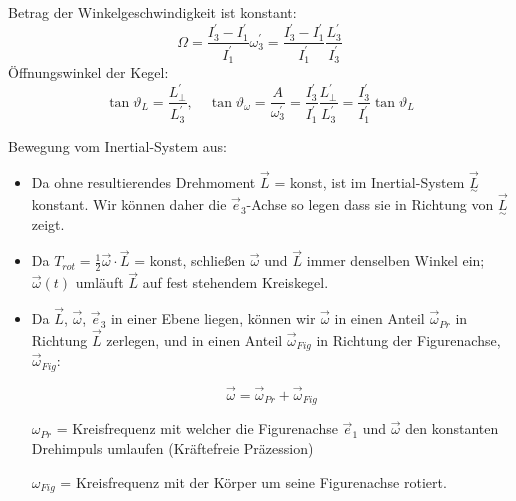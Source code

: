 \documentclass[10pt, letterpaper]{article}
\begin{document}
Betrag der Winkelgeschwindigkeit ist konstant: 
$$\Omega = \frac{I_3^\prime-I_1^\prime}{I_1^\prime}\omega_3^\prime = \frac{I_3^\prime-I_1^\prime}{I_1^\prime}\frac{L_3^\prime}{I_3^\prime}$$
Öffnungswinkel der Kegel:
\[\tan\vartheta_L = \frac{L_\perp^\prime}{L_3^\prime}, \quad \tan\vartheta_\omega = \frac{A}{\omega_3^\prime} = \frac{I_3^\prime}{I_1^\prime}\frac{L_\perp^\prime}{L_3^\prime} = \frac{I_3^\prime}{I_1^\prime}\tan\vartheta_L\]


Bewegung vom Inertial-System aus:


\begin{itemize}
\item Da ohne resultierendes Drehmoment $\vec{L}$ = konst, ist im Inertial-System $\vec{\underset{\sim}{L}}$ konstant. Wir können daher die $\vec{e}_3$-Achse so legen dass sie in Richtung von $\vec{\underset{\sim}{L}}$ zeigt.

\item Da $T_{rot} = \frac{1}{2}\vec{\omega}\cdot\vec{L}$ = konst, schließen $\vec{\omega}$ und $\vec{L}$ immer denselben Winkel ein; $\vec{\omega}(t)$ umläuft $\vec{L}$ auf fest stehendem Kreiskegel.

\item Da $\vec{L}$, $\vec{\omega}$, $\vec{e}_3$ in einer Ebene liegen, können wir $\vec{\omega}$ in einen Anteil $\vec{\omega}_{Pr}$ in Richtung $\vec{L}$ zerlegen, und in einen Anteil $\vec{\omega}_{Fig}$ in Richtung der Figurenachse, $\vec{\omega}_{Fig}$:

\[\vec{\omega} = \vec{\omega}_{Pr} + \vec{\omega}_{Fig}\]

$\omega_{Pr}$ = Kreisfrequenz mit welcher die Figurenachse $\vec{e}_1$ und $\vec{\omega}$ den konstanten Drehimpuls umlaufen (Kräftefreie Präzession)

$\omega_{Fig}$ = Kreisfrequenz mit der Körper um seine Figurenachse rotiert.
\end{itemize}
\end{document}
